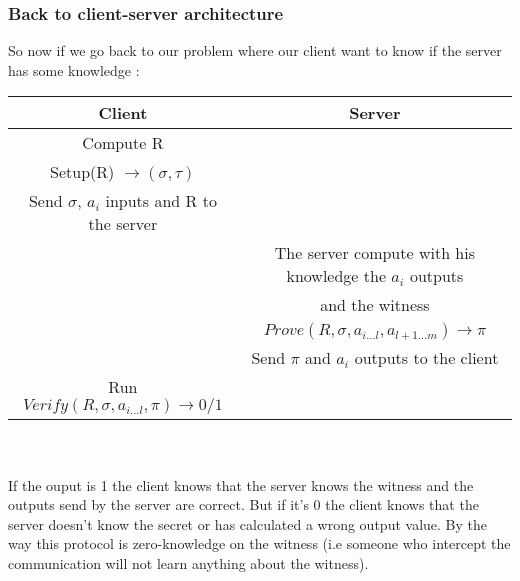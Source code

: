 \subsubsection{Back to client-server architecture}
So now if we go back to our problem where our client want to know if the server has some knowledge :
\\
\begin{tabular}{|c|c|}
  \hline
  \textbf{Client} & \textbf{Server} \TBstrut \\
  \hline
  Compute R & \TBstrut\\ 
  Setup(R) $\rightarrow (\sigma,\tau)$  & \TBstrut\\
  Send $\sigma$, $a_i$ inputs and R to the server & \TBstrut \\
  \hline
     & The server compute with his knowledge the $a_i$ outputs \TBstrut\\
     & and the witness \TBstrut\\
     & $Prove(R, \sigma, a_{i...l}, a_{l+1...m}) \rightarrow \pi$ \TBstrut\\
     & Send $\pi$ and $a_i$ outputs to the client \TBstrut\\
    \hline
    Run $Verify(R, \sigma, a_{i...l}, \pi) \rightarrow 0/1$ & \TBstrut\\

  \hline
\end{tabular}
\\
\\ If the ouput is 1 the client knows that the server knows the witness and the outputs send by the server are correct. But if it's 0 the client knows that the server doesn't know the secret or has calculated a wrong output value. By the way this protocol is zero-knowledge on the witness (i.e someone who intercept the communication will not learn anything about the witness).